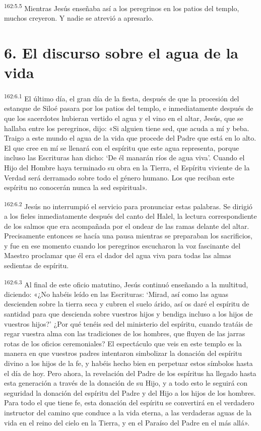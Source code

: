 \par 
\textsuperscript{162:5.5} Mientras Jesús enseñaba así a los peregrinos en los patios del templo, muchos creyeron. Y nadie se atrevió a apresarlo.

\section*{6. El discurso sobre el agua de la vida}
\par 
\textsuperscript{162:6.1} El último día, el gran día de la fiesta, después de que la procesión del estanque de Siloé pasara por los patios del templo, e inmediatamente después de que los sacerdotes hubieran vertido el agua y el vino en el altar, Jesús, que se hallaba entre los peregrinos, dijo: «Si alguien tiene sed, que acuda a mí y beba. Traigo a este mundo el agua de la vida que procede del Padre que está en lo alto. El que cree en mí se llenará con el espíritu que este agua representa, porque incluso las Escrituras han dicho: `De él manarán ríos de agua viva'. Cuando el Hijo del Hombre haya terminado su obra en la Tierra, el Espíritu viviente de la Verdad será derramado sobre todo el género humano. Los que reciban este espíritu no conocerán nunca la sed espiritual».

\par 
\textsuperscript{162:6.2} Jesús no interrumpió el servicio para pronunciar estas palabras. Se dirigió a los fieles inmediatamente después del canto del Halel, la lectura correspondiente de los salmos que era acompañada por el ondear de las ramas delante del altar. Precisamente entonces se hacía una pausa mientras se preparaban los sacrificios, y fue en ese momento cuando los peregrinos escucharon la voz fascinante del Maestro proclamar que él era el dador del agua viva para todas las almas sedientas de espíritu.

\par 
\textsuperscript{162:6.3} Al final de este oficio matutino, Jesús continuó enseñando a la multitud, diciendo: «¿No habéis leído en las Escrituras: `Mirad, así como las aguas descienden sobre la tierra seca y cubren el suelo árido, así os daré el espíritu de santidad para que descienda sobre vuestros hijos y bendiga incluso a los hijos de vuestros hijos?' ¿Por qué tenéis sed del ministerio del espíritu, cuando tratáis de regar vuestra alma con las tradiciones de los hombres, que fluyen de las jarras rotas de los oficios ceremoniales? El espectáculo que veis en este templo es la manera en que vuestros padres intentaron simbolizar la donación del espíritu divino a los hijos de la fe, y habéis hecho bien en perpetuar estos símbolos hasta el día de hoy. Pero ahora, la revelación del Padre de los espíritus ha llegado hasta esta generación a través de la donación de su Hijo, y a todo esto le seguirá con seguridad la donación del espíritu del Padre y del Hijo a los hijos de los hombres. Para todo el que tiene fe, esta donación del espíritu se convertirá en el verdadero instructor del camino que conduce a la vida eterna, a las verdaderas aguas de la vida en el reino del cielo en la Tierra, y en el Paraíso del Padre en el más allá».

